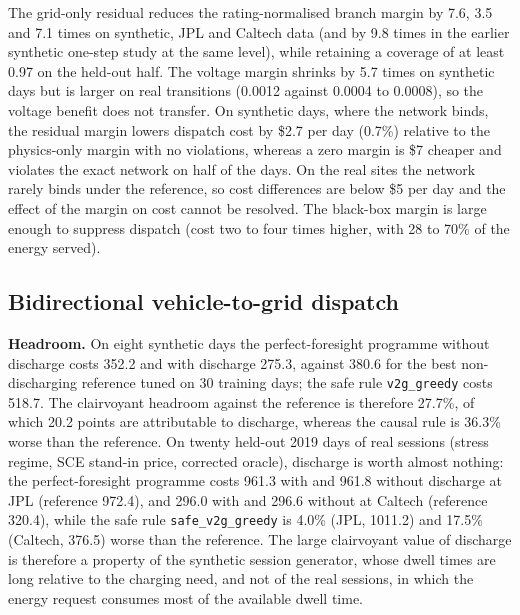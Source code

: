 \documentclass[11pt]{article}
\begin{document}
The grid-only residual reduces the rating-normalised branch margin by 7.6, 3.5 and 7.1 times on synthetic, JPL and Caltech data (and by 9.8 times in the earlier synthetic one-step study at the same level), while retaining a coverage of at least 0.97 on the held-out half. The voltage margin shrinks by 5.7 times on synthetic days but is larger on real transitions (0.0012 against 0.0004 to 0.0008), so the voltage benefit does not transfer. On synthetic days, where the network binds, the residual margin lowers dispatch cost by \$2.7 per day (0.7\%) relative to the physics-only margin with no violations, whereas a zero margin is \$7 cheaper and violates the exact network on half of the days. On the real sites the network rarely binds under the reference, so cost differences are below \$5 per day and the effect of the margin on cost cannot be resolved. The black-box margin is large enough to suppress dispatch (cost two to four times higher, with 28 to 70\% of the energy served).

\subsection{Bidirectional vehicle-to-grid dispatch}\label{sec:v2g}
\textbf{Headroom.} On eight synthetic days the perfect-foresight programme without discharge costs 352.2 and with discharge 275.3, against 380.6 for the best non-discharging reference tuned on 30 training days; the safe rule \texttt{v2g\_greedy} costs 518.7. The clairvoyant headroom against the reference is therefore 27.7\%, of which 20.2 points are attributable to discharge, whereas the causal rule is 36.3\% worse than the reference. On twenty held-out 2019 days of real sessions (stress regime, SCE stand-in price, corrected oracle), discharge is worth almost nothing: the perfect-foresight programme costs 961.3 with and 961.8 without discharge at JPL (reference 972.4), and 296.0 with and 296.6 without at Caltech (reference 320.4), while the safe rule \texttt{safe\_v2g\_greedy} is 4.0\% (JPL, 1011.2) and 17.5\% (Caltech, 376.5) worse than the reference. The large clairvoyant value of discharge is therefore a property of the synthetic session generator, whose dwell times are long relative to the charging need, and not of the real sessions, in which the energy request consumes most of the available dwell time.
\end{document}
